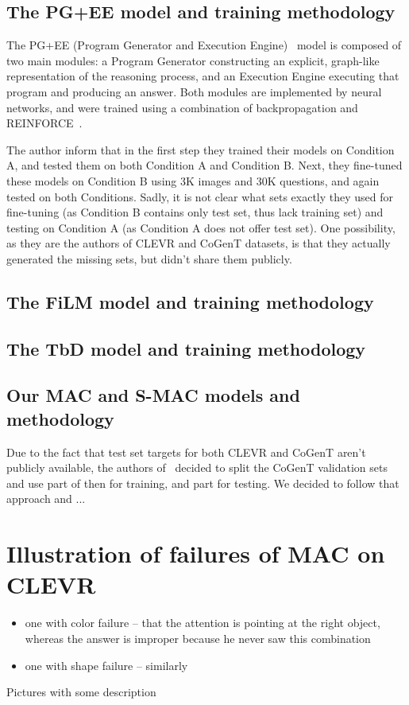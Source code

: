 \subsection{The PG+EE model and training methodology}
The PG+EE (Program Generator and Execution Engine)~\cite{johnson2017inferring}  model is composed of two main modules:
a Program Generator constructing an explicit, graph-like representation of the reasoning process, and an Execution Engine executing that program and producing an answer. 
Both modules are implemented by neural networks, and were trained using a combination of backpropagation and REINFORCE~\cite{williams1992simple}.

The author inform that in the first step they trained their models on Condition A, and tested them on both Condition A and Condition B. 
Next, they fine-tuned these models on Condition B using 3K images and 30K questions, and again tested on both Conditions.
Sadly, it is not clear what sets exactly they used for fine-tuning (as Condition B contains only test set, thus lack training set) and testing on Condition A (as Condition A does not offer test set).
One possibility, as they are the authors of CLEVR and CoGenT datasets, is that they actually generated the missing sets, but didn't share them publicly.

\subsection{The FiLM model and training methodology}

\subsection{The TbD model and training methodology}

\subsection{Our MAC and S-MAC models and methodology}

Due to the fact that test set targets for both CLEVR and CoGenT aren't publicly available, the authors of~\cite{mascharka2018transparency} decided to split
the CoGenT validation sets and use part of then for training, and part for testing. 
We decided to follow that approach and ...   




\section{Illustration of failures of MAC on CLEVR}

\begin{itemize}
\item one with color failure -- that the attention is pointing at the right object, whereas the answer is improper because he never saw this combination
\item one with shape failure -- similarly	
\end{itemize}
Pictures with some description